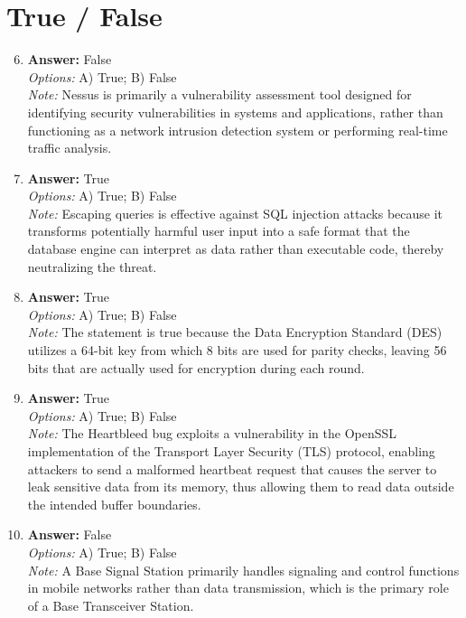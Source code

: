 \documentclass[12pt]{article}
\begin{document}
\section*{True / False}
\begin{enumerate}[label=\arabic*.]
\setcounter{enumi}{5}
\item \textbf{Answer:} False
\\ \textit{Options:} A) True; B) False
\\ \textit{Note:} Nessus is primarily a vulnerability assessment tool designed for identifying security vulnerabilities in systems and applications, rather than functioning as a network intrusion detection system or performing real-time traffic analysis.
\item \textbf{Answer:} True
\\ \textit{Options:} A) True; B) False
\\ \textit{Note:} Escaping queries is effective against SQL injection attacks because it transforms potentially harmful user input into a safe format that the database engine can interpret as data rather than executable code, thereby neutralizing the threat.
\item \textbf{Answer:} True
\\ \textit{Options:} A) True; B) False
\\ \textit{Note:} The statement is true because the Data Encryption Standard (DES) utilizes a 64-bit key from which 8 bits are used for parity checks, leaving 56 bits that are actually used for encryption during each round.
\item \textbf{Answer:} True
\\ \textit{Options:} A) True; B) False
\\ \textit{Note:} The Heartbleed bug exploits a vulnerability in the OpenSSL implementation of the Transport Layer Security (TLS) protocol, enabling attackers to send a malformed heartbeat request that causes the server to leak sensitive data from its memory, thus allowing them to read data outside the intended buffer boundaries.
\item \textbf{Answer:} False
\\ \textit{Options:} A) True; B) False
\\ \textit{Note:} A Base Signal Station primarily handles signaling and control functions in mobile networks rather than data transmission, which is the primary role of a Base Transceiver Station.
\end{enumerate}
\end{document}
